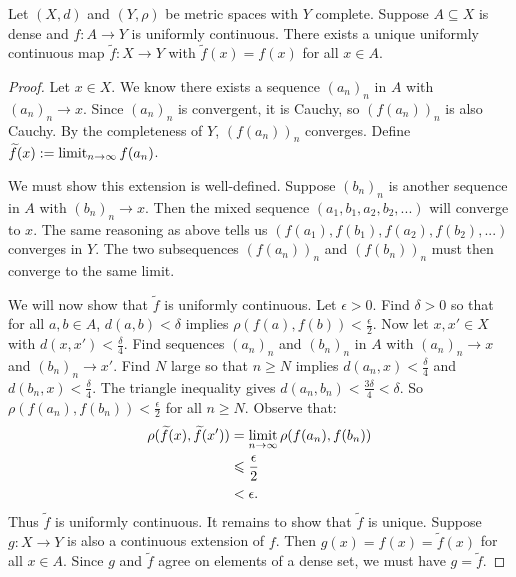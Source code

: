     \begin{theorem}\label{thm:unif-cont-extension}
        Let $(X,d)$ and $(Y,\rho)$ be metric spaces with $Y$ complete. Suppose $A \subseteq X$ is dense and $f:A \rightarrow Y$ is uniformly continuous. There exists a unique uniformly continuous map $\widetilde{f}:X \rightarrow Y$ with $\widetilde{f}(x) = f(x)$ for all $x \in A$.
    \end{theorem}
        \begin{proof}
            Let $x \in X$. We know there exists a sequence $(a_n)_n$ in $A$ with $(a_n)_n \rightarrow x$. Since $(a_n)_n$ is convergent, it is Cauchy, so $(f(a_n))_n$ is also Cauchy. By the completeness of $Y$, $(f(a_n))_n$ converges. Define $\widetilde{f}(x) := \operatorname*{limit}_{n \rightarrow \infty}f(a_n)$.

            We must show this extension is well-defined. Suppose $(b_n)_n$ is another sequence in $A$ with $(b_n)_n \rightarrow x$. Then the mixed sequence $(a_1,b_1,a_2,b_2,...)$ will converge to $x$. The same reasoning as above tells us $(f(a_1),f(b_1),f(a_2),f(b_2),...)$ converges in $Y$. The two subsequences $(f(a_n))_n$ and $(f(b_n))_n$ must then converge to the same limit.

            We will now show that $\widetilde{f}$ is uniformly continuous. Let $\epsilon > 0$. Find $\delta > 0$ so that for all $a,b \in A$, $d(a,b) < \delta$ implies $\rho(f(a),f(b)) < \frac{\epsilon}{2}$. Now let $x,x' \in X$ with $d(x,x') < \frac{\delta}{4}$. Find sequences $(a_n)_n$ and $(b_n)_n$ in $A$ with $(a_n)_n \rightarrow x$ and $(b_n)_n \rightarrow x'$. Find $N$ large so that $n \geq N$ implies $d(a_n,x) < \frac{\delta}{4}$ and $d(b_n,x) < \frac{\delta}{4}$. The triangle inequality gives $d(a_n,b_n) < \frac{3\delta}{4} < \delta$. So $\rho(f(a_n),f(b_n)) < \frac{\epsilon}{2}$ for all $n \geq N$. Observe that:
                \begin{equation*}
                \begin{split}
                    \rho(\widetilde{f}(x),\widetilde{f}(x'))
                    & = \operatorname*{limit}_{n \rightarrow \infty} \rho(f(a_n),f(b_n)) \\
                    & \leqslant \frac{\epsilon}{2} \\
                    & < \epsilon.
                \end{split}
                \end{equation*}
            Thus $\widetilde{f}$ is uniformly continuous. It remains to show that $\widetilde{f}$ is unique. Suppose $g:X\rightarrow Y$ is also a continuous extension of $f$. Then $g(x) = f(x) = \widetilde{f}(x)$ for all $x \in A$. Since $g$ and $\widetilde{f}$ agree on elements of a dense set, we must have $g = \widetilde{f}$.
        \end{proof}

